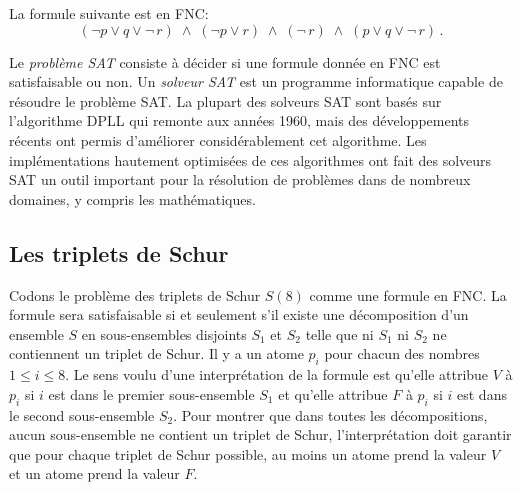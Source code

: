 La formule suivante est en FNC:
\[
(\neg p \vee q \vee \neg \,r) \;\wedge\; (\neg p \vee r)
\;\wedge\; (\neg \,r)\;\wedge\;(p \vee q \vee \neg \,r)\,.
\]

Le \emph{problème SAT} consiste à décider si une formule donnée en FNC est satisfaisable ou non. Un \emph{solveur SAT} est un programme informatique capable de résoudre le problème SAT. La plupart des solveurs SAT sont basés sur l'algorithme DPLL qui remonte aux années 1960, mais des développements récents ont permis d'améliorer considérablement cet algorithme. Les implémentations hautement optimisées de ces algorithmes ont fait des solveurs SAT un outil important pour la résolution de problèmes dans de nombreux domaines, y compris les mathématiques.

\subsection{Les triplets de Schur}

Codons le problème des triplets de Schur $S(8)$ comme une formule en FNC. La formule sera satisfaisable si et seulement s'il existe une décomposition d'un ensemble $S$ en sous-ensembles disjoints $S_1$ et $S_2$ telle que ni $S_1$ ni $S_2$ ne contiennent un triplet de Schur. Il y a un atome $p_i$ pour chacun des nombres $1\leq i \leq 8$. Le sens voulu d'une interprétation de la formule est qu'elle attribue $V$ à $p_i$ si $i$ est dans le premier sous-ensemble $S_1$ et qu'elle attribue $F$ à $p_i$ si $i$ est dans le second sous-ensemble $S_2$. Pour montrer que dans toutes les décompositions, aucun sous-ensemble ne contient un triplet de Schur, l'interprétation doit garantir que pour chaque triplet de Schur possible, au moins un atome prend la valeur $V$ et un atome prend la valeur $F$. 

